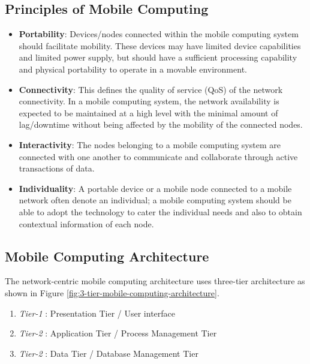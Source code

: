 \subsection{Principles of Mobile Computing}
\begin{itemize}
\item \textbf{Portability}: Devices/nodes connected within the mobile computing
system should facilitate mobility. These devices may have limited
device capabilities and limited power supply, but should have a
sufficient processing capability and physical portability to operate in a
movable environment.

\item \textbf{Connectivity}: This defines the quality of service (QoS) of the network
connectivity. In a mobile computing system, the network availability is
expected to be maintained at a high level with the minimal amount of
lag/downtime without being affected by the mobility of the connected
nodes.

\item \textbf{Interactivity}: The nodes belonging to a mobile computing system are
connected with one another to communicate and collaborate through
active transactions of data.

\item \textbf{Individuality}: A portable device or a mobile node connected to a mobile
network often denote an individual; a mobile computing system should
be able to adopt the technology to cater the individual needs and also
to obtain contextual information of each node.
\end{itemize}



\subsection{Mobile Computing Architecture}
The network-centric mobile computing architecture uses three-tier architecture as shown in Figure \ref{fig:3-tier-mobile-computing-architecture}.
\begin{enumerate}
	\item \textit{Tier-1} : Presentation Tier / User interface 
	\item \textit{Tier-2} : Application Tier / Process Management Tier
	\item \textit{Tier-2} : Data Tier / Database Management Tier
\end{enumerate}

